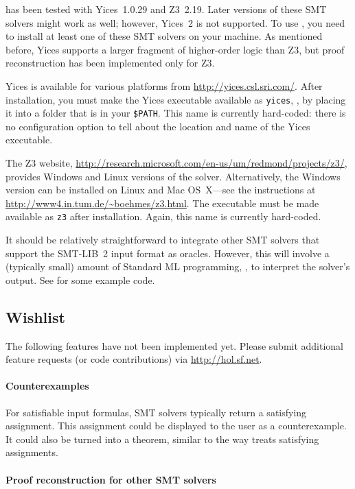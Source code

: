  has been tested with Yices~1.0.29 and Z3~2.19.  Later
versions of these SMT solvers might work as well; however, Yices~2 is
not supported.  To use , you need to install at least
one of these SMT solvers on your machine.  As mentioned before, Yices
supports a larger fragment of higher-order logic than Z3, but proof
reconstruction has been implemented only for Z3.

Yices is available for various platforms from
\url{http://yices.csl.sri.com/}.  After installation, you must make
the Yices executable available as {\tt yices}, \eg, by placing it into
a folder that is in your {\tt \$PATH}.  This name is currently
hard-coded: there is no configuration option to tell \HOL{} about the
location and name of the Yices executable.

The Z3 website,
\url{http://research.microsoft.com/en-us/um/redmond/projects/z3/},
provides Windows and Linux versions of the solver.  Alternatively, the
Windows version can be installed on Linux and Mac OS~X---see the
instructions at \url{http://www4.in.tum.de/~boehmes/z3.html}.  The
executable must be made available as {\tt z3} after installation.
Again, this name is currently hard-coded.

It should be relatively straightforward to integrate other SMT solvers
that support the SMT-LIB~2 input format as oracles.  However, this
will involve a (typically small) amount of Standard ML programming,
\eg, to interpret the solver's output.  See  for some
example code.

\subsection{Wishlist}

The following features have not been implemented yet.  Please submit
additional feature requests (or code contributions) via
\url{http://hol.sf.net}.

\paragraph{Counterexamples}

For satisfiable input formulas, SMT solvers typically return a
satisfying assignment.  This assignment could be displayed to the
\HOL{} user as a counterexample.  It could also be turned into a
theorem, similar to the way  treats satisfying
assignments.

\paragraph{Proof reconstruction for other SMT solvers}

